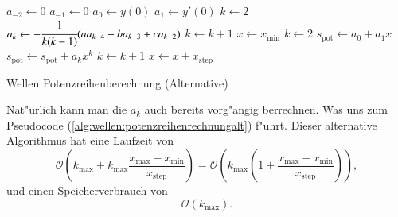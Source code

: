 \begin{algorithm}
	\begin{algorithmic}[1]
		\State $a_{-2} \gets 0$
		\State $a_{-1} \gets 0$
		\State $a_0 \gets y(0)$
		\State $a_1 \gets y'(0)$
		\State $k \gets 2$
		\State $a_k \gets -\cfrac{1}{k(k-1)} (aa_{k-4}+ba_{k-3}+ca_{k-2})$
		\State $k \gets k + 1$
		\EndFor
		\State $x \gets x_{\text{min}}$
		\State $k \gets 2$
		\State $s_{\text{pot}} \gets a_0 + a_1x$
		\State $s_{\text{pot}} \gets s_{\text{pot}} + a_k x^k$
		\State $k \gets k + 1$
		\EndFor
		\State $x \gets x + x_{\text{step}}$
		\EndFor
	\end{algorithmic}
	\caption{Wellen Potenzreihenberechnung (Alternative)}
	\label{alg:wellen:potenzreihenrechnungalt}
\end{algorithm}

Nat"urlich kann man die $a_k$ auch bereits vorg"angig berrechnen. Was uns zum 
Pseudocode (\ref{alg:wellen:potenzreihenrechnungalt}) f"uhrt. Dieser 
alternative Algorithmus hat eine Laufzeit von
\begin{equation*}
	\mathcal{O}
	\left(k_{\text{max}} + 
		k_{\text{max}}\frac{x_{\text{max}}-x_{\text{min}}}{x_{\text{step}}}
	\right)
	=
	\mathcal{O}
	\left(
		k_{\text{max}}
		\left(
			1+\frac{x_{\text{max}}-x_{\text{min}}}{x_{\text{step}}}
		\right)
	\right),
\end{equation*}
und einen Speicherverbrauch von
\begin{equation*}
	\mathcal{O}
	\left(
		k_{\text{max}}
	\right).
\end{equation*}